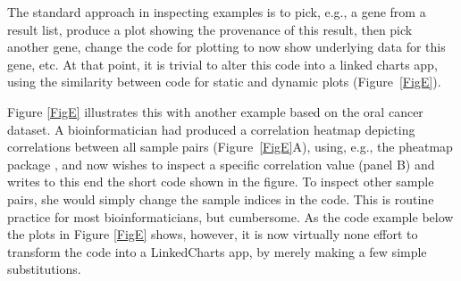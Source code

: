 \documentclass[twocolumn,10pt]{article}
\begin{document}
The standard approach in inspecting examples is to pick, e.g., a gene from a result list, produce a plot showing the provenance of this result, then pick another gene, change the code for plotting to now show underlying data for this gene, etc. At that point, it is trivial to alter this code into a linked charts app, using the similarity between code for static and dynamic plots (Figure\ \ref{FigE}).

Figure \ref{FigE} illustrates this with another example based on the oral cancer dataset. A bioinformatician had produced a correlation heatmap depicting correlations between all sample pairs (Figure\ \ref{FigE}A), using, e.g., the pheatmap package \citep{kolde_2019}, and now wishes to inspect a specific correlation value (panel B) and writes to this end the short code shown in the figure. To inspect other sample pairs, she would simply change the sample indices in the code. This is routine practice for most bioinformaticians, but cumbersome. As the code example below the plots in Figure \ref{FigE} shows, however, it is now virtually none effort to transform the code into a LinkedCharts app, by merely making a few simple substitutions.
\end{document}
